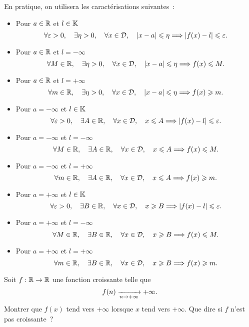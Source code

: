 \documentclass{magnolia}
\begin{document}
\begin{remarqueUnique}
\remarque En pratique, on utilisera les caractérisations suivantes~:
\begin{itemize}
  \item Pour $a\in\mathbb{R}$ et $l\in\mathbb{K}$
    \[\forall \varepsilon>0 ,\quad \exists \eta>0 ,\quad \forall x\in\mathcal{D}
      ,\quad \left|x-a\right|\leqslant\eta \Longrightarrow \left|f(x)-l\right|\leqslant\varepsilon.\]
  \item Pour $a\in\mathbb{R}$ et $l=-\infty$
    \[\forall M\in\mathbb{R} ,\quad \exists \eta>0 ,\quad \forall x\in\mathcal{D}
      ,\quad \left|x-a\right|\leqslant\eta \Longrightarrow f(x)\leqslant M.\]
  \item Pour $a\in\mathbb{R}$ et $l=+\infty$
    \[\forall m\in\mathbb{R} ,\quad \exists \eta>0 ,\quad \forall x\in\mathcal{D}
      ,\quad \left|x-a\right|\leqslant\eta \Longrightarrow f(x)\geqslant m.\]
  \item Pour $a=-\infty$ et $l\in\mathbb{K}$
    \[\forall \varepsilon>0 ,\quad \exists A\in\mathbb{R} ,\quad \forall x\in\mathcal{D}
      ,\quad x\leqslant A \Longrightarrow \left|f(x)-l\right|\leqslant\varepsilon.\]
  \item Pour $a=-\infty$ et $l=-\infty$
    \[\forall M\in\mathbb{R} ,\quad \exists A\in\mathbb{R} ,\quad \forall x\in\mathcal{D}
      ,\quad x\leqslant A \Longrightarrow f(x)\leqslant M.\]
  \item Pour $a=-\infty$ et $l=+\infty$
    \[\forall m\in\mathbb{R} ,\quad \exists A\in\mathbb{R} ,\quad \forall x\in\mathcal{D}
      ,\quad x\leqslant A \Longrightarrow f(x)\geqslant m.\]
  \item Pour $a=+\infty$ et $l\in\mathbb{K}$
    \[\forall \varepsilon>0 ,\quad \exists B\in\mathbb{R} ,\quad \forall x\in\mathcal{D}
      ,\quad x\geqslant B \Longrightarrow \left|f(x)-l\right|\leqslant\varepsilon.\]
  \item Pour $a=+\infty$ et $l=-\infty$
    \[\forall M\in\mathbb{R} ,\quad \exists B\in\mathbb{R} ,\quad \forall x\in\mathcal{D}
      ,\quad x\geqslant B \Longrightarrow f(x)\leqslant M.\]
  \item Pour $a=+\infty$ et $l=+\infty$
    \[\forall m\in\mathbb{R} ,\quad \exists B\in\mathbb{R} ,\quad \forall x\in\mathcal{D}
      ,\quad x\geqslant B \Longrightarrow f(x)\geqslant m.\]
  \end{itemize}
\end{remarqueUnique}

\begin{exoUnique}
\exo Soit $f:\mathbb{R}\to\mathbb{R}$ une fonction croissante telle que
  \[f(n)\xrightarrow[n\rightarrow +\infty]{}+\infty.\]
  Montrer que $f(x)$ tend vers $+\infty$ lorsque $x$ tend vers $+\infty$.
  Que dire si $f$ n'est pas croissante~?
\end{exoUnique}
\end{document}
